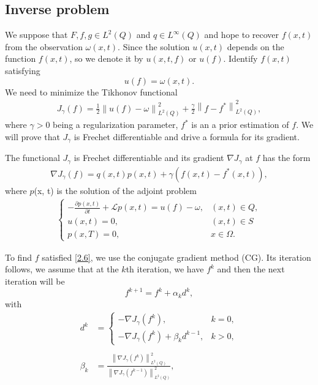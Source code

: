 \documentclass[twocolumn]{article}
\begin{document}
\subsection{Inverse problem}

We suppose that $F, f, g \in L^2(Q)$ and $ q\in L^\infty(Q)$ and hope to recover $f(x, t)$ from the observation $\omega(x, t)$. Since the solution $u(x, t)$ depends on the function $f(x, t)$, so we denote it by $u(x, t, f)$ or $u(f)$. Identify $f(x, t)$ satisfying 
$$u(f)=\omega(x, t).$$ 
We need to minimize the Tikhonov functional
\begin{align}\label{2.6}
	J_{\gamma}(f)=\frac{1}{2}\left\|u(f)-\omega\right\|_{L^2(Q)}^2+\frac{\gamma}{2}\left\|f-f^*\right\|_{L^2(Q)}^2,
\end{align}
where $\gamma>0$ being a regularization parameter, $f^*$ is an a prior estimation of $f$.
We will prove that $J_\gamma$ is Frechet differentiable and drive a formula for its gradient.
\begin{dl}
	The functional $J_\gamma$ is Frechet differentiable and its gradient $\nabla J_\gamma$ at $f$ has the form 
	\begin{align}\label{2.7}
		\nabla J_\gamma(f)=q(x, t)p(x, t)+\gamma \left(f(x, t)-f^*(x, t)\right),
	\end{align}
	where $p$(x, t) is the solution of the adjoint problem
	\begin{align}\label{2.8} 
		\begin{cases}
		-\frac{\partial p(x, t)}{\partial t}+\mathcal{L}p(x, t)=u(f)-\omega, & (x, t)\in Q,\\
		u(x, t)=0, & (x, t)\in S\\
		p(x, T)=0, & x\in \Omega.
		\end{cases}
	\end{align}
\end{dl}
\noindent To find $f$ satisfied \eqref{2.6}, we use the conjugate gradient method (CG). Its iteration follows, we assume that at the $k$th iteration, we have $f^k$ and then the next iteration will be
$$f^{k+1}=f^k+\alpha_kd^k,$$
with
\begin{align*}
	d^k&=\left\{\begin{array}{ll}
	-\nabla J_\gamma(f^k),& k=0,\\
	-\nabla J_\gamma(f^k)+\beta_kd^{k-1},& k>0,
	\end{array}\right.\\\\
	\beta_k&=\frac{\left\|\nabla J_\gamma (f^k)\right\|^2_{L^2(Q)}}{\left\|\nabla J_\gamma (f^{k-1})\right\|^2_{L^2(Q)}},
\end{align*}
\end{document}
